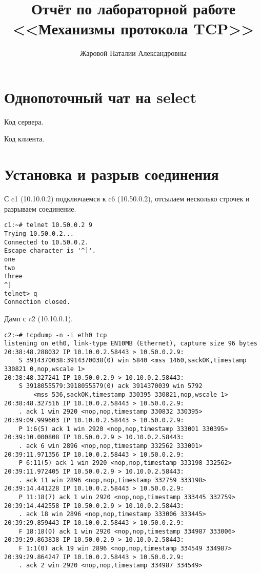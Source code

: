 \documentclass[a4paper,12pt]{article}
\title{Отчёт по лабораторной работе \\ <<Механизмы протокола TCP>>}
\author{Жаровой Наталии Александровны}
\begin{document}
\maketitle

\tableofcontents


\section{Однопоточный чат на select}

Код сервера. 


Код клиента. 



\section{Установка и разрыв соединения}

С c1 (10.10.0.2) подключаемся к c6 (10.50.0.2), отсылаем несколько строчек и разрываем соединение.

\begin{Verbatim}
c1:~# telnet 10.50.0.2 9
Trying 10.50.0.2...
Connected to 10.50.0.2.
Escape character is '^]'.
one
two
three
^]
telnet> q
Connection closed.
\end{Verbatim}

Дамп с c2 (10.10.0.1).

\begin{Verbatim}
c2:~# tcpdump -n -i eth0 tcp
listening on eth0, link-type EN10MB (Ethernet), capture size 96 bytes
20:38:48.288032 IP 10.10.0.2.58443 > 10.50.0.2.9: 
    S 3914370038:3914370038(0) win 5840 <mss 1460,sackOK,timestamp 330821 0,nop,wscale 1>
20:38:48.327241 IP 10.50.0.2.9 > 10.10.0.2.58443: 
    S 3918055579:3918055579(0) ack 3914370039 win 5792 
        <mss 536,sackOK,timestamp 330395 330821,nop,wscale 1>
20:38:48.327516 IP 10.10.0.2.58443 > 10.50.0.2.9: 
    . ack 1 win 2920 <nop,nop,timestamp 330832 330395>
20:39:09.999603 IP 10.10.0.2.58443 > 10.50.0.2.9: 
    P 1:6(5) ack 1 win 2920 <nop,nop,timestamp 333001 330395>
20:39:10.000808 IP 10.50.0.2.9 > 10.10.0.2.58443: 
    . ack 6 win 2896 <nop,nop,timestamp 332562 333001>
20:39:11.971356 IP 10.10.0.2.58443 > 10.50.0.2.9: 
    P 6:11(5) ack 1 win 2920 <nop,nop,timestamp 333198 332562>
20:39:11.972405 IP 10.50.0.2.9 > 10.10.0.2.58443: 
    . ack 11 win 2896 <nop,nop,timestamp 332759 333198>
20:39:14.441228 IP 10.10.0.2.58443 > 10.50.0.2.9: 
    P 11:18(7) ack 1 win 2920 <nop,nop,timestamp 333445 332759>
20:39:14.442558 IP 10.50.0.2.9 > 10.10.0.2.58443: 
    . ack 18 win 2896 <nop,nop,timestamp 333006 333445>
20:39:29.859443 IP 10.10.0.2.58443 > 10.50.0.2.9: 
    F 18:18(0) ack 1 win 2920 <nop,nop,timestamp 334987 333006>
20:39:29.863838 IP 10.50.0.2.9 > 10.10.0.2.58443: 
    F 1:1(0) ack 19 win 2896 <nop,nop,timestamp 334549 334987>
20:39:29.864247 IP 10.10.0.2.58443 > 10.50.0.2.9: 
    . ack 2 win 2920 <nop,nop,timestamp 334987 334549>
\end{Verbatim}
\end{document}
